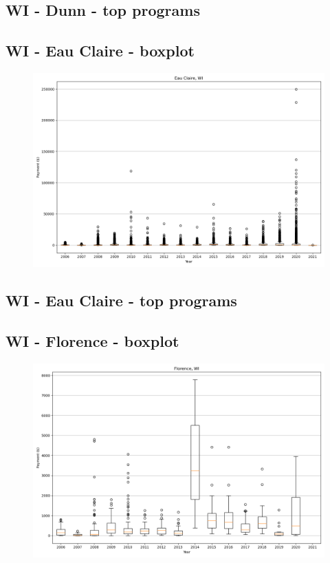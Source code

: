 \subsection*{WI - Dunn - top programs}

\newpage
\subsection*{WI - Eau Claire - boxplot}
\begin{figure}[h]
\centering
\includegraphics[width=7in]{../output/boxplots/counties/Eau Claire-WI_boxplot.png}
\end{figure}


\subsection*{WI - Eau Claire - top programs}

\newpage
\subsection*{WI - Florence - boxplot}
\begin{figure}[h]
\centering
\includegraphics[width=7in]{../output/boxplots/counties/Florence-WI_boxplot.png}
\end{figure}



